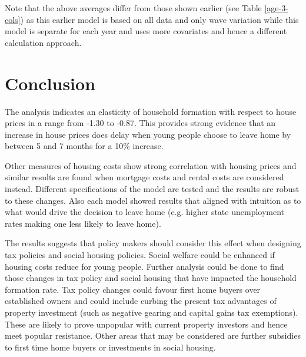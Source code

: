 \documentclass[12pt]{article}
\begin{document}
Note that the above averages differ from those shown earlier (see Table \ref{age-3-cols}) as this earlier model is based on all data and only wave variation while this model is separate for each year and uses more covariates and hence a different calculation approach.

\section{Conclusion}

The analysis indicates an elasticity of household formation with respect to house prices in a range from -1.30 to -0.87. This provides strong evidence that an increase in house prices does delay when young people choose to leave home by between 5 and 7 months for a 10\% increase.

Other measures of housing costs show strong correlation with housing prices and similar results are found when mortgage costs and rental costs are considered instead. Different specifications of the model are tested and the results are robust to these changes. Also each model showed results that aligned with intuition as to what would drive the decision to leave home (e.g. higher state unemployment rates making one less likely to leave home).

The results suggests that policy makers should consider this effect when designing tax policies and social housing policies. Social welfare could be enhanced if housing costs reduce for young people. Further analysis could be done to find those changes in tax policy and social housing that have impacted the household formation rate. Tax policy changes could favour first home buyers over established owners and could include curbing the present tax advantages of property investment (such as negative gearing and capital gains tax exemptions). These are likely to prove unpopular with current property investors and hence meet popular resistance. Other areas that may be considered are further subsidies to first time home buyers or investments in social housing.

\printbibliography{}  %
\end{document}

